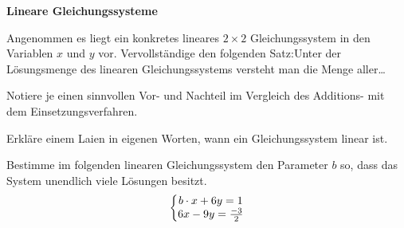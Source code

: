 \documentclass[11pt]{exam}
\newcommand{\theme}{Lineare Gleichungssysteme}
\begin{document}
\fontsize{14}{14}\selectfont
\begin{center}
    \huge\bf\theme
\end{center}

\begin{questions}
\question[4]
Angenommen es liegt ein konkretes lineares $2\times2$ Gleichungssystem in den Variablen $x$ und $y$ vor. Vervollständige den folgenden Satz:\newline\flqq Unter der Lösungsmenge des linearen Gleichungssystems versteht man die Menge aller\ldots\frqq


\question[2]
Notiere je einen sinnvollen Vor- und Nachteil im Vergleich des Additions- mit dem Einsetzungsverfahren.


\question[4]
Erkläre einem Laien in eigenen Worten, wann ein Gleichungssystem linear ist.


\question[4]
Bestimme im folgenden linearen Gleichungssystem den Parameter $b$ so, dass das System unendlich viele Lösungen besitzt.
\[\left\{\begin{matrix}b\cdot x+6y=1\\6x-9y=\frac{-3}{2}\end{matrix}\right.\]


\noaddpoints
\question[\totalpoints]
\addpoints
\begin{parts}

\end{parts}
\end{questions}
\end{document}
